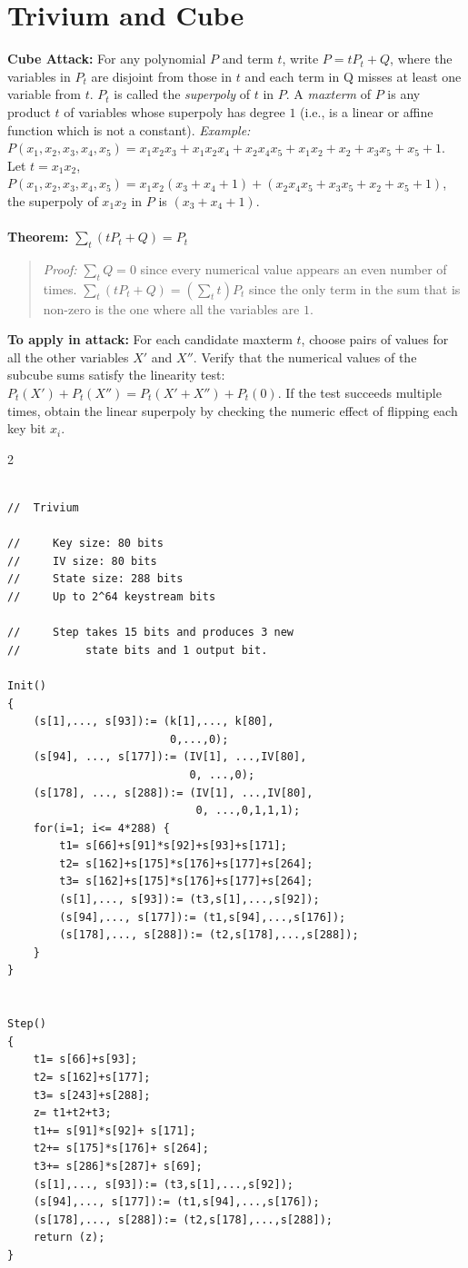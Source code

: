\section{Trivium and Cube}
{\bf Cube Attack:}
For any polynomial $P$ and term $t$, write $P= tP_t+Q$, where
the variables in $P_t$ are disjoint from those in $t$
and each term in Q misses at least one variable from $t$.
$P_t$ is called the \emph{superpoly} of $t$ in $P$.  
A \emph{maxterm} of $P$ is any product $t$ of variables whose superpoly has degree $1$ 
(i.e., is a linear or affine function which is not a constant).
\emph{Example:}
$P(x_1,x_2,x_3,x_4,x_5) =x_1x_2x_3+x_1x_2x_4+x_2x_4x_5+x_1x_2+x_2+x_3x_5+x_5+1 $.
Let $t=x_1x_2$, $P(x_1,x_2,x_3,x_4,x_5)= x_1x_2(x_3+x_4+1)+(x_2x_4x_5+x_3x_5+x_2+x_5+1)$,
the superpoly of $x_1x_2$ in $P$ is $(x_3+x_4+1)$.
\\
\\
{\bf Theorem:} 
$\sum_t (tP_t+Q) = P_t$
\begin{quote}
\emph{Proof:}
$\sum_t Q = 0$ since every numerical value appears an even number of times.
$\sum_t (tP_t+Q) = 
(\sum_t t) P_t$ since the only term in the sum that is non-zero is the one where all the variables are $1$.
\end{quote}
{\bf To apply in attack:}
For each candidate maxterm $t$, choose pairs of values for all the other variables 
$X'$ and $X''$. Verify that the numerical values of the subcube sums satisfy the linearity test:  
$P_t(X')+P_t(X'')= P_t(X'+X'')+P_t(0)$.
If the test succeeds multiple times, obtain the linear superpoly by checking the 
numeric effect of flipping each key bit $x_i$.
\begin {multicols} {2} {
\begin {verbatim}

//  Trivium

//     Key size: 80 bits
//     IV size: 80 bits
//     State size: 288 bits
//     Up to 2^64 keystream bits

//     Step takes 15 bits and produces 3 new 
//          state bits and 1 output bit.

Init() 
{
    (s[1],..., s[93]):= (k[1],..., k[80], 
                         0,...,0);
    (s[94], ..., s[177]):= (IV[1], ...,IV[80], 
                            0, ...,0);
    (s[178], ..., s[288]):= (IV[1], ...,IV[80], 
                             0, ...,0,1,1,1);
    for(i=1; i<= 4*288) {
        t1= s[66]+s[91]*s[92]+s[93]+s[171];
        t2= s[162]+s[175]*s[176]+s[177]+s[264];
        t3= s[162]+s[175]*s[176]+s[177]+s[264];
        (s[1],..., s[93]):= (t3,s[1],...,s[92]);
        (s[94],..., s[177]):= (t1,s[94],...,s[176]);
        (s[178],..., s[288]):= (t2,s[178],...,s[288]);
    }
}


Step() 
{
    t1= s[66]+s[93];
    t2= s[162]+s[177];
    t3= s[243]+s[288];
    z= t1+t2+t3;
    t1+= s[91]*s[92]+ s[171];
    t2+= s[175]*s[176]+ s[264];
    t3+= s[286]*s[287]+ s[69];
    (s[1],..., s[93]):= (t3,s[1],...,s[92]);
    (s[94],..., s[177]):= (t1,s[94],...,s[176]);
    (s[178],..., s[288]):= (t2,s[178],...,s[288]);
    return (z);
}

\end{verbatim}
}
\end {multicols}
